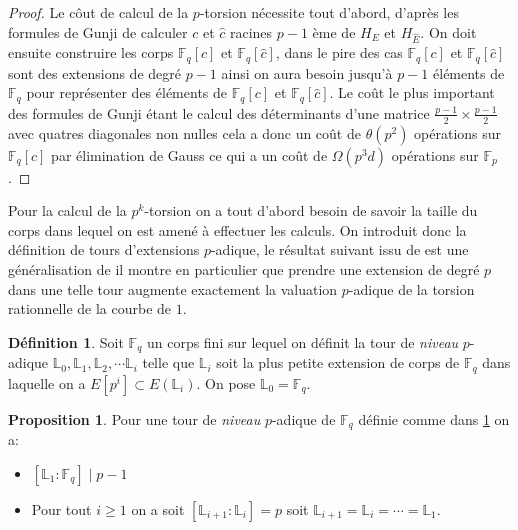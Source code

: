 \documentclass[10pt,a4paper]{book}
\theoremstyle{plain}
\theoremstyle{definition}
\theoremstyle{definition}
\theoremstyle{definition}
\newtheorem{prop}[thm]{Proposition}
\theoremstyle{definition}
\newtheorem{defi}[thm]{Définition}
\theoremstyle{remark}
\theoremstyle{remark}
\theoremstyle{definition}
\begin{document}
\begin{proof}
Le côut de calcul de la $p$-torsion nécessite tout d'abord, d'après les formules de Gunji de calculer $c$ et $\widehat{c}$ racines $p-1$ ème de $H_{E}$ et $H_{\widehat{E}}$. On doit ensuite construire les corps $\mathbb{F}_q[c]$ et $\mathbb{F}_q[\widehat{c}]$, dans le pire des cas $\mathbb{F}_q[c]$ et $\mathbb{F}_q[\widehat{c}]$ sont des extensions de degré $p-1$ ainsi on aura besoin jusqu'à $p-1$ éléments de $\mathbb{F}_q$ pour représenter des éléments de $\mathbb{F}_q[c]$ et $\mathbb{F}_q[\widehat{c}]$. Le coût le plus important des formules de Gunji étant le calcul des déterminants d'une matrice $\frac{p-1}{2} \times \frac{p-1}{2}$ avec quatres diagonales non nulles cela a donc un coût de $\theta(p^2)$ opérations sur $\mathbb{F}_q[c]$ par élimination de Gauss ce qui a un coût de $\Omega(p^3d)$ opérations sur $\mathbb{F}_p$.
\end{proof}

Pour la calcul de la $p^k$-torsion on a tout d'abord besoin de savoir la taille du corps dans lequel on est amené à effectuer les calculs. On introduit donc la définition de tours d'extensions $p$-adique, le résultat suivant issu de \cite{DeFeo10} est une généralisation de \cite[Proposition 26]{Ler97a} il montre en particulier que prendre une extension de degré $p$ dans une telle tour augmente exactement la valuation $p$-adique de la torsion rationnelle de la courbe de $1$.

\begin{defi}
\label{def:p-adic:level}
Soit $\mathbb{F}_q$ un corps fini sur lequel on définit la tour de \emph{niveau} $p$-adique  $\mathbb{L}_0,  \mathbb{L}_1, \mathbb{L}_2, \cdots \mathbb{L}_i$ telle que $\mathbb{L}_i$ soit la plus petite extension de corps de $\mathbb{F}_q$ dans laquelle on a $E[p^i] \subset E(\mathbb{L}_i)$. On pose $\mathbb{L}_0=\mathbb{F}_q$.
\end{defi}

\begin{prop}
\label{pro:ord:fro}
Pour une tour de \emph{niveau} $p$-adique de $\mathbb{F}_q$ définie comme dans \ref{def:p-adic:level} on a:
\begin{itemize}
\item $[\mathbb{L}_1:\mathbb{F}_q] \mid p-1$
\item Pour tout $i \geqslant 1$ on a soit $[\mathbb{L}_{i+1}:\mathbb{L}_{i}]=p$ soit $\mathbb{L}_{i+1}=\mathbb{L}_{i}=\cdots = \mathbb{L}_{1}$.
\end{itemize}
\end{prop}
\end{document}
